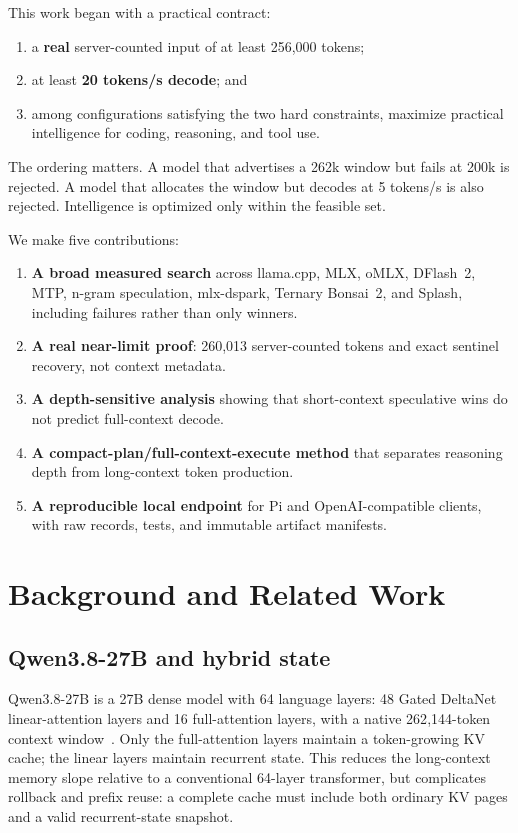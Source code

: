 \documentclass[11pt]{article}
\begin{document}
This work began with a practical contract:
\begin{enumerate}[leftmargin=1.6em]
\item a \textbf{real} server-counted input of at least 256{,}000 tokens;
\item at least \textbf{20 tokens/s decode}; and
\item among configurations satisfying the two hard constraints, maximize practical intelligence for coding, reasoning, and tool use.
\end{enumerate}
The ordering matters. A model that advertises a 262k window but fails at 200k is rejected. A model that allocates the window but decodes at 5 tokens/s is also rejected. Intelligence is optimized only within the feasible set.

We make five contributions:
\begin{enumerate}[leftmargin=1.6em]
\item \textbf{A broad measured search} across llama.cpp, MLX, oMLX, DFlash~2, MTP, n-gram speculation, mlx-dspark, Ternary Bonsai~2, and Splash, including failures rather than only winners.
\item \textbf{A real near-limit proof}: 260{,}013 server-counted tokens and exact sentinel recovery, not context metadata.
\item \textbf{A depth-sensitive analysis} showing that short-context speculative wins do not predict full-context decode.
\item \textbf{A compact-plan/full-context-execute method} that separates reasoning depth from long-context token production.
\item \textbf{A reproducible local endpoint} for Pi and OpenAI-compatible clients, with raw records, tests, and immutable artifact manifests.
\end{enumerate}

\section{Background and Related Work}
\subsection{Qwen3.8-27B and hybrid state}
Qwen3.8-27B is a 27B dense model with 64 language layers: 48 Gated DeltaNet linear-attention layers and 16 full-attention layers, with a native 262{,}144-token context window~\cite{qwen38}. Only the full-attention layers maintain a token-growing KV cache; the linear layers maintain recurrent state. This reduces the long-context memory slope relative to a conventional 64-layer transformer, but complicates rollback and prefix reuse: a complete cache must include both ordinary KV pages and a valid recurrent-state snapshot.
\end{document}
